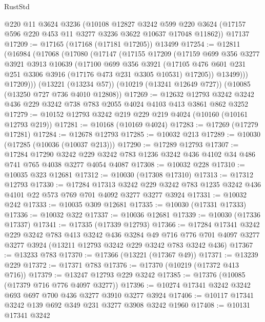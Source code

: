 \begin{lexlean}{RustStd}
\begin{coremodule}
    @220
    @11
    @3624
    @3236
    (@10108
      @12827
      @3242
      @599
      @220
      @3624
      (@17157 @596 @220 @453 @11 @3277 @3236 @3622 @10637 @17048 @11862))
    @17137
@17209 := @17165 (@17168 (@17181 @17205)) @13499
@17254 := @12811
    (@16984
      (@17068
        (@17080
          (@17147
            (@17155
              @17209
              (@17159
                @699
                @356
                @3277
                @3921
                @3913
                @10639
                (@17100
                  @699
                  @356
                  @3921
                  (@17105 @476 @601 @231 @251 @3306 @3916 (@17176 @473 @231 @3305 @10531) @17205))
                @13499)))
          @17209)))
    (@13221 (@13234 @57))
    (@10219 (@13241 @12649 @727))
    (@10085 (@13250 @727 @736 @4010 @12808))
@17269 := @12632
    @12793
    @3242
    @3242
    @436
    @229
    @3242
    @738
    @783
    @2055
    @4024
    @4103
    @413
    @3861
    @862
    @3252
@17279 := @10152 @12793 @3242 @219 @229 @219 @4024 (@10160 (@10161 @12793 @219))
@17281 := @10168 (@10169 @4024)
@17283 := @17269 (@17279 @17281)
@17284 := @12678 @12793
@17285 := @10032 @213
@17289 := @10030 (@17285 (@10036 (@10037 @213)))
@17290 := @17289 @12793
@17307 := @17284
    @17290
    @3242
    @229
    @3242
    @783
    @1236
    @3242
    @436
    @4102
    @34
    @486
    @741
    @765
    @4038
    @3277
    @4054
    @4087
@17308 := @10032 @228
@17310 := @10035 @323 @12681
@17312 := @10030 (@17308 @17310)
@17313 := @17312 @12793
@17330 := @17284
    @17313
    @3242
    @229
    @3242
    @783
    @1235
    @3242
    @436
    @4101
    @22
    @573
    @769
    @701
    @4092
    @3277
    @3277
    @3924
@17331 := @10032 @242
@17333 := @10035 @309 @12681
@17335 := @10030 (@17331 @17333)
@17336 := @10032 @322
@17337 := @10036 @12681
@17339 := @10030 (@17336 @17337)
@17341 := @17335 (@17339 @12793)
@17366 := @17284
    @17341
    @3242
    @229
    @3242
    @783
    @413
    @3242
    @436
    @3284
    @49
    @716
    @776
    @701
    @4097
    @3277
    @3277
    @3924
    (@13211 @12793 @3242 @229 @3242 @783 @3242 @436)
@17367 := @13233 @783
@17370 := @17366 (@13221 (@17367 @49))
@17371 := @13239 @229
@17372 := @17371 @783
@17376 := @17370 (@10219 (@17372 @413 @716))
@17379 := @13247 @12793 @229 @3242
@17385 := @17376 (@10085 (@17379 @716 @776 @4097 @3277))
@17396 := @10274 @17341 @3242 @3242 @693 @697 @700 @436 @3277 @3910 @3277 @3924
@17406 := @10117 @17341 @3242 @139 @692 @349 @231 @3277 @3908 @3242 @1960
@17408 := @10131 @17341 @3242

\end{coremodule}
\end{lexlean}
